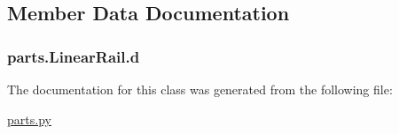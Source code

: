 \subsection{Member Data Documentation}
\hypertarget{classparts_1_1_linear_rail_aec60902b77e5604b1d7c2a012dfd1e6f}{}
\subsubsection[{d}]{\setlength{\rightskip}{0pt plus 5cm}parts.\+Linear\+Rail.\+d}\label{classparts_1_1_linear_rail_aec60902b77e5604b1d7c2a012dfd1e6f}


The documentation for this class was generated from the following file\+:\begin{DoxyCompactItemize}
\item 
\hyperlink{parts_8py}{parts.\+py}\end{DoxyCompactItemize}
